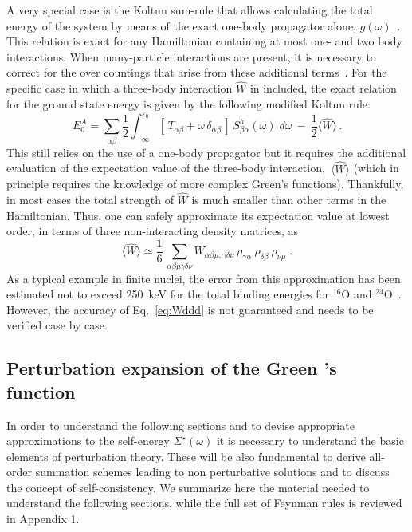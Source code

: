 A very special case is the Koltun sum-rule that allows calculating the total energy of the system by means of the exact one-body propagator alone, $g(\omega)$~\cite{ch11_Galitskii1958KSR,ch11_Koltun1974KSR}. 
This relation is exact for any Hamiltonian containing at most one- and two body interactions.  When many-particle interactions are present, it is necessary 
to correct for the over countings that arise from these additional terms~\cite{ch11_Carbone2013Nov}. For the specific case in which a three-body interaction $\widehat{W}$ in included, the exact relation for the ground state energy is given by the following modified Koltun rule:
\begin{equation}
  \label{eq:Koltun_hW}
  E^A_0 = \sum_{\alpha\beta} \frac{1}{2} 
            \int_{-\infty}^{\varepsilon^-_0}  [\,T_{\alpha\beta}+\omega\,\delta_{\alpha\beta}\, ]
            \, S^h_{\beta\alpha}(\omega) \; d\omega
            ~-~  \frac{1}{2} \langle \widehat W\rangle \, .
\end{equation}
This still relies on the use of a one-body propagator but
 it requires  the additional evaluation of the expectation value of the three-body interaction,~$\langle \widehat W \rangle$ (which in principle requires the knowledge of more complex Green's functions).
%
Thankfully, in most cases the total strength of $\widehat{W}$ is much smaller than other terms in the Hamiltonian. Thus, one can safely approximate its expectation value at lowest order, in terms of three  non-interacting density matrices, as
\begin{equation}
   \label{eq:Wddd}
    \langle \widehat W\rangle\simeq\frac{1}{6} \, \sum_{\alpha\beta\mu\gamma\delta\nu} W_{\alpha\beta\mu,\gamma\delta\nu}~\rho_{\gamma\alpha}~\rho_{\delta\beta}~\rho_{\nu\mu} \; .
\end{equation}
%
As a typical example in finite nuclei, the error from this approximation has been estimated not to exceed 250~keV for the total binding energies for $^{16}$O and $^{24}$O~\cite{ch11_Cipollone2013prl}. However, the accuracy of Eq.~\eqref{eq:Wddd} is not guaranteed and needs to be verified case by case.


\subsection{Perturbation expansion of the Green 's function}
\label{sec:pertexp}

In order to understand the following sections and to devise appropriate approximations to the self-energy $\Sigma^{\star}(\omega)$ it is necessary to understand the basic elements of perturbation theory.  These will be also fundamental to derive all-order summation schemes leading to non perturbative solutions and to discuss the concept of self-consistency. We summarize here the material needed to understand the following sections, while the full set of Feynman rules is reviewed in  Appendix 1.

